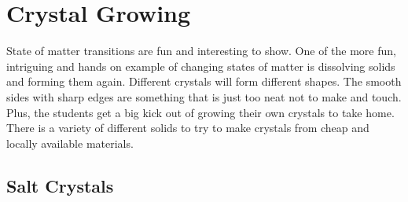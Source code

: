 \section{Crystal Growing}

State of matter transitions are fun and interesting to show. One of the more fun, intriguing and hands on example of changing states of matter is dissolving solids and forming them again. Different crystals will form different shapes. The smooth sides with sharp edges are something that is just too neat not to make and touch. Plus, the students get a big kick out of growing their own crystals to take home. There is a variety of different solids to try to make crystals from cheap and locally available materials.

\subsection{Salt Crystals}
